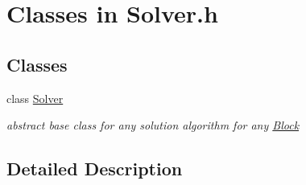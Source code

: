 \hypertarget{group___solver___c_l_a_s_s_e_s}{}\section{Classes in Solver.\+h}
\label{group___solver___c_l_a_s_s_e_s}
\subsection*{Classes}
\begin{DoxyCompactItemize}
\item 
class \mbox{\hyperlink{class_s_m_spp__di__unipi__it_1_1_solver}{Solver}}
\begin{DoxyCompactList}\small\item\em abstract base class for any solution algorithm for any \mbox{\hyperlink{class_s_m_spp__di__unipi__it_1_1_block}{Block}} \end{DoxyCompactList}\end{DoxyCompactItemize}


\subsection{Detailed Description}
